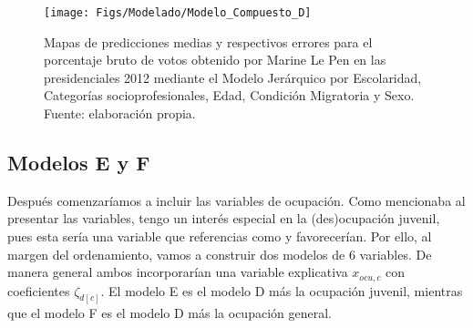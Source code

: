 \begin{figure}[h]
	\centering
	\texttt{[image: Figs/Modelado/Modelo\_Compuesto\_D]}
	\caption{Mapas de predicciones medias y respectivos errores para el porcentaje bruto de votos obtenido por Marine Le Pen en las presidenciales 2012 mediante el Modelo Jerárquico por Escolaridad, Categorías socioprofesionales, Edad, Condición Migratoria y Sexo. Fuente: elaboración propia.}
	\label{fig:Modelo_Compuesto_D}
\end{figure}

\subsection*{Modelos E y F}

Después comenzaríamos a incluir las variables de ocupación. Como mencionaba al presentar las variables, tengo un interés especial en la (des)ocupación juvenil, pues esta sería una variable que referencias como \textcite{LeBras16} y \textcite{Perrineau07} favorecerían. Por ello, al margen del ordenamiento, vamos a construir dos modelos de 6 variables. De manera general ambos incorporarían una variable explicativa $x_{ocu,c}$ con coeficientes $\zeta_{d[c]}$. El modelo E es el modelo D más la ocupación juvenil, mientras que el modelo F es el modelo D más la ocupación general. 

